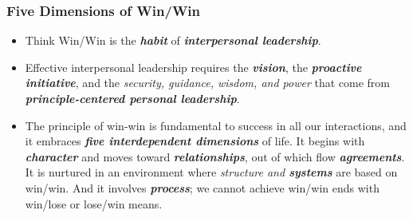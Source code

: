 \documentclass[11pt]{article}
\begin{document}
\subsubsection{Five Dimensions of Win/Win}
\begin{itemize}
\item Think Win/Win is the \emph{\textbf{habit}} of \emph{\textbf{interpersonal leadership}}.

\item Effective interpersonal leadership requires the \emph{\textbf{vision}}, the \emph{\textbf{proactive initiative}}, and the \emph{security, guidance, wisdom, and power} that come from \textit{\textbf{principle-centered personal leadership}}.

\item The principle of win-win is fundamental to success in all our interactions, and it embraces \emph{\textbf{five interdependent dimensions}} of life. It begins with \emph{\textbf{character}} and moves toward \emph{\textbf{relationships}}, out of which flow \emph{\textbf{agreements}}. It is nurtured in an environment where \emph{structure and \textbf{systems}} are based on win/win. And it involves \emph{\textbf{process}}; we cannot achieve win/win ends with win/lose or lose/win means.
\end{itemize}
\end{document}
